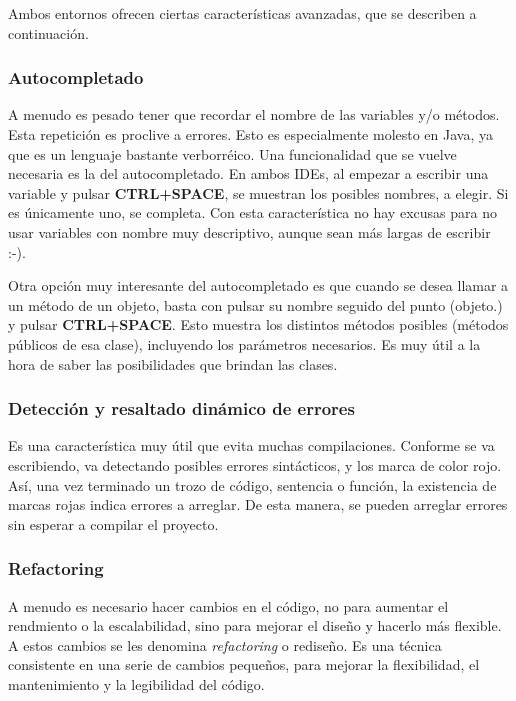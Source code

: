 \documentclass[11pt]{article}
\begin{document}
Ambos entornos ofrecen ciertas características avanzadas, que se describen a
continuación.

\subsubsection{Autocompletado} \label{sec-3-2-1}

A menudo es pesado tener que recordar el nombre de las variables y/o métodos.
Esta repetición es proclive a errores. Esto es especialmente molesto en Java, ya
que es un lenguaje bastante verborréico. Una funcionalidad que se vuelve
necesaria es la del autocompletado. En ambos IDEs, al empezar a escribir una
variable y pulsar \textbf{CTRL+SPACE}, se muestran los posibles nombres, a
elegir. Si es únicamente uno, se completa. Con esta característica no hay
excusas para no usar variables con nombre muy descriptivo, aunque sean más
largas de escribir :-).

Otra opción muy interesante del autocompletado es que cuando se desea llamar a
un método de un objeto, basta con pulsar su nombre seguido del punto
(\textsf{objeto.}) y pulsar \textbf{CTRL+SPACE}. Esto muestra los distintos
métodos posibles (métodos públicos de esa clase), incluyendo los parámetros
necesarios. Es muy útil a la hora de saber las posibilidades que brindan las
clases.

\subsubsection{Detección y resaltado dinámico de errores} \label{sec-3-2-2}

Es una característica muy útil que evita muchas compilaciones. Conforme se va
escribiendo, va detectando posibles errores sintácticos, y los marca de color
rojo. Así, una vez terminado un trozo de código, sentencia o función, la
existencia de marcas rojas indica errores a arreglar. De esta manera, se pueden
arreglar errores sin esperar a compilar el proyecto.


\subsubsection{Refactoring} \label{sec-3-2-3}

A menudo es necesario hacer cambios en el código, no para aumentar el rendmiento
o la escalabilidad, sino para mejorar el diseño y hacerlo más flexible. A estos
cambios se les denomina \textit{refactoring} o rediseño. Es una técnica
consistente en una serie de cambios pequeños, para mejorar la flexibilidad, el
mantenimiento y la legibilidad del código.
\end{document}

